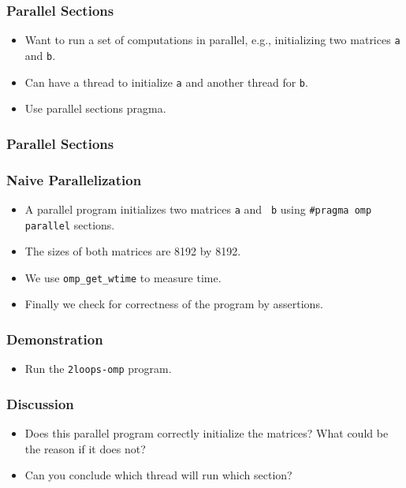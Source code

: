 \documentclass{beamer}
\begin{document}
\begin{frame}
  \frametitle{Parallel Sections}
  \begin{itemize}
  \item Want to run a set of computations in parallel, e.g.,
    initializing two matrices {\tt a} and {\tt b}.
  \item Can have a thread to initialize {\tt a} and another thread for
    {\tt b}.
  \item Use parallel sections pragma.
  \end{itemize}
\end{frame}

\begin{frame}
  \frametitle{Parallel Sections}
\end{frame}

\begin{frame}
  \frametitle{Naive Parallelization}
  \begin{itemize}
  \item A parallel program initializes two matrices {\tt a} and {\tt
    b} using {\tt \#pragma omp parallel} sections.
  \item The sizes of both matrices are 8192 by 8192.
  \item We use {\tt omp\_get\_wtime} to measure time.
  \item Finally we check for correctness of the program by
    assertions.
  \end{itemize}
\end{frame}


\begin{frame}
  \frametitle{Demonstration}
  \begin{itemize}
  \item Run the {\tt 2loops-omp} program.
  \end{itemize}
\end{frame}

\begin{frame}
  \frametitle{Discussion}
  \begin{itemize}
  \item Does this parallel program correctly initialize the matrices?
    What could be the reason if it does not?
  \item Can you conclude which thread will run which section?
  \end{itemize}
\end{frame}
\end{document}
